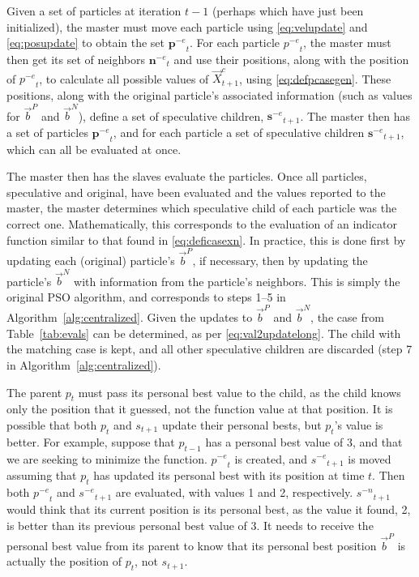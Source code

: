\documentclass[ms,electronic,twosidetoc,letterpaper,chaptercenter,parttop,equalmargins]{byumsphd}
\newcommand{\alg}[1]{Algorithm~\ref{alg:#1}}
\providecommand{\pers}{\ensuremath{P}}
\providecommand{\neigh}{\ensuremath{N}}
\providecommand{\nbest}{\ensuremath{\Vec{b}^\neigh}}
\providecommand{\pbest}{\ensuremath{\Vec{b}^\pers}}
\providecommand{\specpos}{\ensuremath{\vec{X}}}
\providecommand{\casegen}{\ensuremath{c}}
\providecommand{\noeval}[1]{\ensuremath{#1^{-e}}}
\providecommand{\nonbest}[1]{\ensuremath{#1^{-n}}}
\providecommand{\p}{\ensuremath{p}}
\providecommand{\pset}{\ensuremath{\mathbf{p}}}
\providecommand{\s}{\ensuremath{s}}
\providecommand{\sset}{\ensuremath{\mathbf{s}}}
\providecommand{\nset}{\ensuremath{\mathbf{n}}}
\begin{document}
Given a set of particles at iteration $t-1$ (perhaps which have just been
initialized), the master must move each particle using \eqref{eq:velupdate} and
\eqref{eq:posupdate} to obtain the set $\noeval{\pset}_t$.  For each particle
$\noeval{\p}_t$, the master must then get its set of neighbors
$\noeval{\nset}_t$ and use their positions, along with the position of
$\noeval{\p}_t$, to calculate all possible values of
$\specpos_{t+1}^{\casegen}$, using \eqref{eq:defpcasegen}.  These positions,
along with the original particle's associated information (such as values for
$\pbest$ and $\nbest$), define a set of speculative children,
$\noeval{\sset}_{t+1}$.  The master then has a set of particles
$\noeval{\pset}_t$, and for each particle a set of speculative children
$\noeval{\sset}_{t+1}$, which can all be evaluated at once.

The master then has the slaves evaluate the particles.  Once all particles,
speculative and original, have been evaluated and the values reported to the
master, the master determines which speculative child of each particle was the
correct one.  Mathematically, this corresponds to the evaluation of an
indicator function similar to that found in \eqref{eq:deficasexn}.  In
practice, this is done first by updating each (original) particle's $\pbest$,
if necessary, then by updating the particle's $\nbest$ with information from
the particle's neighbors.  This is simply the original PSO algorithm, and
corresponds to steps 1--5 in \alg{centralized}.  Given the updates to $\pbest$
and $\nbest$, the case from Table~\ref{tab:evals} can be determined, as per
\eqref{eq:val2updatelong}.  The child with the matching case is kept, and all
other speculative children are discarded (step 7 in \alg{centralized}).

The parent $\p_t$ must pass its personal best value to the child, as the child
knows only the position that it guessed, not the function value at that
position.  It is possible that both $\p_t$ and $\s_{t+1}$ update their personal
bests, but $\p_t$'s value is better.  For example, suppose that $\p_{t-1}$ has
a personal best value of 3, and that we are seeking to minimize the function.
$\noeval{\p}_t$ is created, and $\noeval{\s}_{t+1}$ is moved assuming that
$\p_t$ has updated its personal best with its position at time $t$.  Then both
$\noeval{\p}_t$ and $\noeval{\s}_{t+1}$ are evaluated, with values 1 and 2,
respectively.  $\nonbest{\s}_{t+1}$ would think that its current position is
its personal best, as the value it found, 2, is better than its previous
personal best value of 3.  It needs to receive the personal best value from its
parent to know that its personal best position $\pbest$ is actually the
position of $\p_t$, not $\s_{t+1}$.
\end{document}
